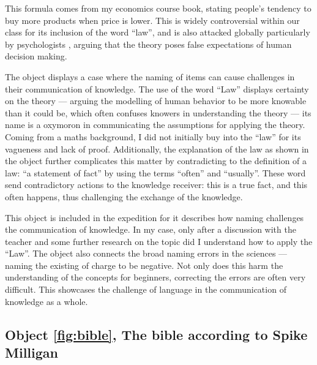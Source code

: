 \documentclass[a4paper,11pt]{article}
\begin{document}
This formula comes from my economics course book, stating people's tendency to buy more products when price is lower. This is widely controversial within our class for its inclusion of the word ``law'', and is also attacked globally particularly by psychologists \parencite{DKahneman}, arguing that the theory poses false expectations of human decision making.

The object displays a case where the naming of items can cause challenges in their communication of knowledge.
The use of the word ``Law'' displays certainty on the theory --- arguing the modelling of human behavior to be more knowable than it could be, which often confuses knowers in understanding the theory --- its name is a oxymoron in communicating the assumptions for applying the theory. Coming from a maths background, I did not initially buy into the ``law'' for its vagueness and lack of proof. Additionally, the explanation of the law as shown in the object further complicates this matter by contradicting to the definition of a law: ``a statement of fact'' by using the terms ``often'' and ``usually''. These word send contradictory actions to the knowledge receiver: this is a true fact, and this often happens, thus challenging the exchange of the knowledge.

This object is included in the expedition for it describes how naming challenges the communication of knowledge. In my case, only after a discussion with the teacher and some further research on the topic did I understand how to apply the ``Law''. The object also connects the broad naming errors in the sciences --- naming the existing of charge to be negative. Not only does this harm the understanding of the concepts for beginners, correcting the errors are often very difficult. This showcases the challenge of language in the communication of knowledge as a whole.


\subsection*{Object \ref{fig:bible}, The bible according to Spike Milligan}
\end{document}
